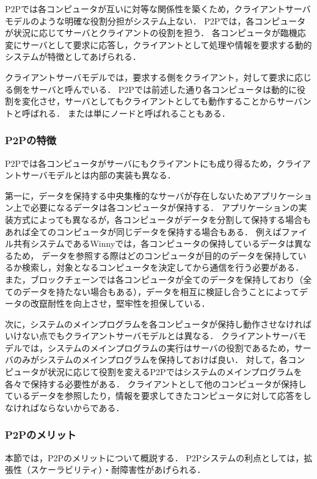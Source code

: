 P2Pでは各コンピュータが互いに対等な関係性を築くため，クライアントサーバモデルのような明確な役割分担がシステム上ない．
P2Pでは，各コンピュータが状況に応じてサーバとクライアントの役割を担う．
各コンピュータが臨機応変にサーバとして要求に応答し，クライアントとして処理や情報を要求する動的システムが特徴としてあげられる．

クライアントサーバモデルでは，要求する側をクライアント，対して要求に応じる側をサーバと呼んでいる．
P2Pでは前述した通り各コンピュータは動的に役割を変化させ，サーバとしてもクライアントとしても動作することからサーバントと呼ばれる．
または単にノードと呼ばれることもある．

\subsubsection{P2Pの特徴}

P2Pでは各コンピュータがサーバにもクライアントにも成り得るため，クライアントサーバモデルとは内部の実装も異なる．

第一に，データを保持する中央集権的なサーバが存在しないためアプリケーション上で必要になるデータは各コンピュータが保持する．
アプリケーションの実装方式によっても異なるが，各コンピュータがデータを分割して保持する場合もあれば全てのコンピュータが同じデータを保持する場合もある．
例えばファイル共有システムであるWinnyでは，各コンピュータの保持しているデータは異なるため，
データを参照する際はどのコンピュータが目的のデータを保持しているか検索し，対象となるコンピュータを決定してから通信を行う必要がある．
また，ブロックチェーンでは各コンピュータが全てのデータを保持しており（全てのデータを持たない場合もある），データを相互に検証し合うことによってデータの改竄耐性を向上させ，堅牢性を担保している．

次に，システムのメインプログラムを各コンピュータが保持し動作させなければいけない点でもクライアントサーバモデルとは異なる．
クライアントサーバモデルでは，システムのメインプログラムの実行はサーバの役割であるため，サーバのみがシステムのメインプログラムを保持しておけば良い．
対して，各コンピュータが状況に応じて役割を変えるP2Pではシステムのメインプログラムを各々で保持する必要性がある．
クライアントとして他のコンピュータが保持しているデータを参照したり，情報を要求してきたコンピュータに対して応答をしなければならないからである．

\subsubsection{P2Pのメリット}

本節では，P2Pのメリットについて概説する．
P2Pシステムの利点としては，拡張性（スケーラビリティ）・耐障害性があげられる．

